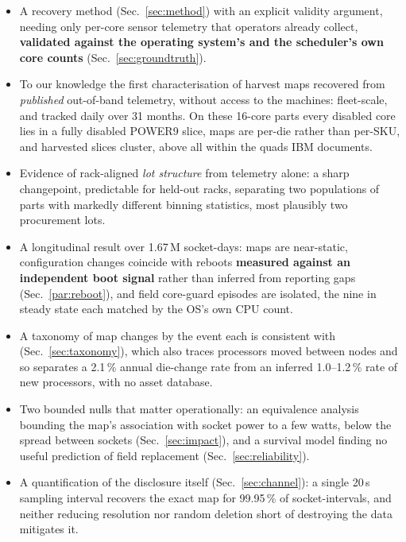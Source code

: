 \documentclass[10pt,conference]{IEEEtran}
\begin{document}
\begin{itemize}
\item A recovery method (Sec.~\ref{sec:method}) with an explicit validity argument, needing only
      per-core sensor telemetry that operators already collect, \textbf{validated against the
      operating system's and the scheduler's own core counts} (Sec.~\ref{sec:groundtruth}).
\item To our knowledge the first characterisation of harvest maps recovered from
      \emph{published} out-of-band telemetry, without access to the machines: fleet-scale, and
      tracked daily over 31 months. On these 16-core parts every disabled core lies in a fully
      disabled POWER9 slice, maps are per-die rather than per-SKU, and harvested slices cluster,
      above all within the quads IBM documents.
\item Evidence of rack-aligned \emph{lot structure} from telemetry alone: a sharp changepoint,
      predictable for held-out racks, separating two populations of parts with markedly different
      binning statistics, most plausibly two procurement lots.
\item A longitudinal result over 1.67\,M socket-days: maps are near-static, configuration changes
      coincide with reboots \textbf{measured against an independent boot signal} rather than
      inferred from reporting gaps (Sec.~\ref{par:reboot}), and field core-guard episodes are
      isolated, the nine in steady state each matched by the OS's own CPU count.
\item A taxonomy of map changes by the event each is consistent with (Sec.~\ref{sec:taxonomy}),
      which also traces processors moved between nodes and so separates a 2.1\,\% annual die-change
      rate from an inferred 1.0--1.2\,\% rate of new processors, with no asset database.
\item Two bounded nulls that matter operationally: an equivalence analysis bounding the map's
      association with socket power to a few watts, below the spread between sockets
      (Sec.~\ref{sec:impact}), and a survival model finding no useful prediction of
      field replacement (Sec.~\ref{sec:reliability}).
\item A quantification of the disclosure itself (Sec.~\ref{sec:channel}): a single 20\,s
      sampling interval recovers the exact map for 99.95\,\% of socket-intervals, and neither
      reducing resolution nor random deletion short of destroying the data mitigates it.
\end{itemize}
\end{document}

